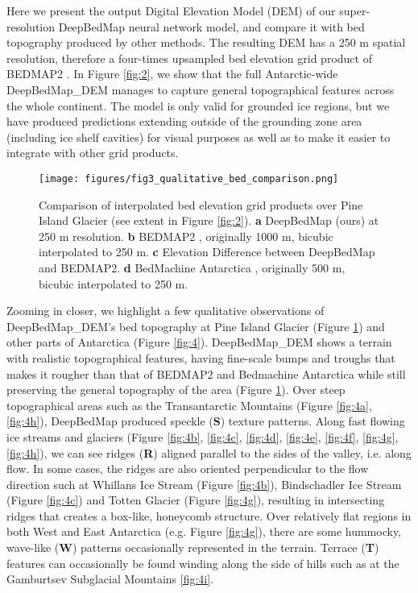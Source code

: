 \documentclass[tc, manuscript]{copernicus}
\begin{document}
Here we present the output Digital Elevation Model (DEM) of our super-resolution DeepBedMap neural network model, and compare it with bed topography produced by other methods.
The resulting DEM has a 250 m spatial resolution, therefore a four-times upsampled bed elevation grid product of BEDMAP2 \citep{FretwellBedmap2improvedice2013}.
In Figure \ref{fig:2}, we show that the full Antarctic-wide DeepBedMap\_DEM manages to capture general topographical features across the whole continent.
The model is only valid for grounded ice regions, but we have produced predictions extending outside of the grounding zone area (including ice shelf cavities) for visual purposes as well as to make it easier to integrate with other grid products.

\begin{figure}[htbp]
  \texttt{[image: figures/fig3\_qualitative\_bed\_comparison.png]}
  \caption{
    Comparison of interpolated bed elevation grid products over Pine Island Glacier (see extent in Figure \ref{fig:2}).
    \textbf{a} DeepBedMap (ours) at 250 m resolution.
    \textbf{b} BEDMAP2 \citep{FretwellBedmap2improvedice2013}, originally 1000 m, bicubic interpolated to 250 m.
    \textbf{c} Elevation Difference between DeepBedMap and BEDMAP2.
    \textbf{d} BedMachine Antarctica \citep{MorlighemMEaSUREsBedMachineAntarctica2019}, originally 500 m, bicubic interpolated to 250 m.
  }
  \label{fig:3}
\end{figure}

Zooming in closer, we highlight a few qualitative observations of DeepBedMap\_DEM's bed topography at Pine Island Glacier (Figure \ref{fig:3}) and other parts of Antarctica (Figure \ref{fig:4}).
DeepBedMap\_DEM shows a terrain with realistic topographical features, having fine-scale bumps and troughs that makes it rougher than that of BEDMAP2 \citep{FretwellBedmap2improvedice2013} and Bedmachine Antarctica \citep{MorlighemMEaSUREsBedMachineAntarctica2019} while still preserving the general topography of the area (Figure \ref{fig:3}).
Over steep topographical areas such as the Transantarctic Mountains (Figure \ref{fig:4a}, \ref{fig:4h}), DeepBedMap produced speckle (\textbf{S}) texture patterns.
Along fast flowing ice streams and glaciers (Figure \ref{fig:4b}, \ref{fig:4c}, \ref{fig:4d}, \ref{fig:4e}, \ref{fig:4f}, \ref{fig:4g}, \ref{fig:4h}), we can see ridges (\textbf{R}) aligned parallel to the sides of the valley, i.e. along flow.
In some cases, the ridges are also oriented perpendicular to the flow direction such at Whillans Ice Stream (Figure \ref{fig:4b}), Bindschadler Ice Stream (Figure \ref{fig:4c}) and Totten Glacier (Figure \ref{fig:4g}), resulting in intersecting ridges that creates a box-like, honeycomb structure.
Over relatively flat regions in both West and East Antarctica (e.g. Figure \ref{fig:4g}), there are some hummocky, wave-like (\textbf{W}) patterns occasionally represented in the terrain.
Terrace (\textbf{T}) features can occasionally be found winding along the side of hills such as at the Gamburtsev Subglacial Mountains \ref{fig:4i}.
\end{document}
